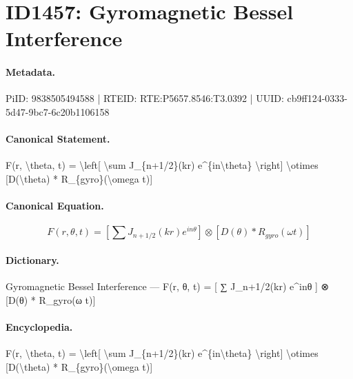 \section*{ID1457: Gyromagnetic Bessel Interference}
\paragraph{Metadata.}
PiID: 9838505494588 | RTEID: RTE:P5657.8546:T3.0392 | UUID: cb9ff124-0333-5d47-9bc7-6c20b1106158

\paragraph{Canonical Statement.}
F(r, \textbackslash{}theta, t) = \textbackslash{}left[ \textbackslash{}sum J\_\{n+1/2\}(kr) e\textasciicircum{}\{in\textbackslash{}theta\} \textbackslash{}right] \textbackslash{}otimes [D(\textbackslash{}theta) * R\_\{gyro\}(\textbackslash{}omega t)]

\paragraph{Canonical Equation.}
\[
F(r, \theta, t) = \left[ \sum J_{n+1/2}(kr) e^{in\theta} \right] \otimes [D(\theta) * R_{gyro}(\omega t)]
\]

\paragraph{Dictionary.}
Gyromagnetic Bessel Interference — F(r, θ, t) = [ ∑ J\_n+1/2(kr) e\textasciicircum{}inθ ] ⊗ [D(θ) * R\_gyro(ω t)]

\paragraph{Encyclopedia.}
F(r, \textbackslash{}theta, t) = \textbackslash{}left[ \textbackslash{}sum J\_\{n+1/2\}(kr) e\textasciicircum{}\{in\textbackslash{}theta\} \textbackslash{}right] \textbackslash{}otimes [D(\textbackslash{}theta) * R\_\{gyro\}(\textbackslash{}omega t)]
